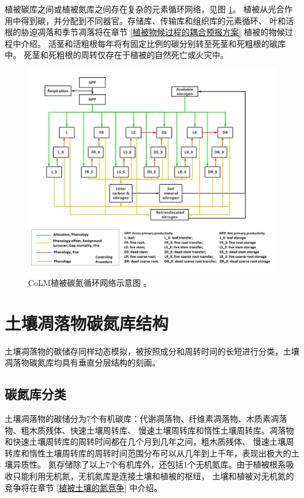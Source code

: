 植被碳库之间或植被氮库之间存在复杂的元素循环网络，见图 \ref{fig:CoLM植被碳氮循环网络示意图}。
植被从光合作用中得到碳，并分配到不同器官。存储库、传输库和组织库的元素循环、
叶和活根的胁迫凋落和季节凋落将在章节 \ref{植被物候过程的耦合预报方案} 植被的物候过程中介绍。
活茎和活粗根每年将有固定比例的碳分别转至死茎和死粗根的碳库中。
死茎和死粗根的周转仅存在于植被的自然死亡或火灾中。
{
\begin{figure}[htbp]
\centering
\includegraphics{Figures/碳氮库结构/CoLM植被碳氮循环网络示意图.png}
\caption{CoLM植被碳氮循环网络示意图 \citep{lu2020full}。}
\label{fig:CoLM植被碳氮循环网络示意图}
\end{figure}
}

\section{土壤凋落物碳氮库结构}\label{土壤凋落物碳氮库结构}
土壤凋落物的碳储存同样动态模拟，被按照成分和周转时间的长短进行分类，土壤凋落物碳氮库均具有垂直分层结构的刻画。
\subsection{碳氮库分类}\label{碳氮库分类}
土壤凋落物的碳储分为7个有机碳库：代谢凋落物、纤维素凋落物、木质素凋落物、粗木质残体、快速土壤周转库、
慢速土壤周转库和惰性土壤周转库。凋落物和快速土壤周转库的周转时间都在几个月到几年之间，粗木质残体、
慢速土壤周转库和惰性土壤周转库的周转时间范围分布可以从几年到上千年，表现出极大的土壤异质性。
氮存储除了以上7个有机库外，还包括1个无机氮库。由于植被根系吸收只能利用无机氮，无机氮库是连接土壤和植被的枢纽，
土壤和植被对无机氮的竞争将在章节 \ref{植被土壤的氮竞争} 中介绍。


